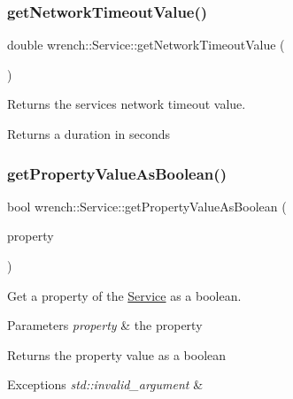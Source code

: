 \subsubsection{\texorpdfstring{get\+Network\+Timeout\+Value()}{getNetworkTimeoutValue()}}
{\footnotesize\ttfamily double wrench\+::\+Service\+::get\+Network\+Timeout\+Value (\begin{DoxyParamCaption}{ }\end{DoxyParamCaption})}



Returns the service\textquotesingle{}s network timeout value. 

\begin{DoxyReturn}{Returns}
a duration in seconds 
\end{DoxyReturn}
\mbox{\label{classwrench_1_1_service_aaacc5398b7fa16262348446006dba884}} 
\subsubsection{\texorpdfstring{get\+Property\+Value\+As\+Boolean()}{getPropertyValueAsBoolean()}}
{\footnotesize\ttfamily bool wrench\+::\+Service\+::get\+Property\+Value\+As\+Boolean (\begin{DoxyParamCaption}\item[{std\+::string}]{property }\end{DoxyParamCaption})}



Get a property of the \hyperlink{classwrench_1_1_service}{Service} as a boolean. 


\begin{DoxyParams}{Parameters}
{\em property} & the property \\
\hline
\end{DoxyParams}
\begin{DoxyReturn}{Returns}
the property value as a boolean
\end{DoxyReturn}

\begin{DoxyExceptions}{Exceptions}
{\em std\+::invalid\+\_\+argument} & \\
\hline
\end{DoxyExceptions}
\mbox{\label{classwrench_1_1_service_af7d4b5085ba46d9cead58f2d253e8339}} 
